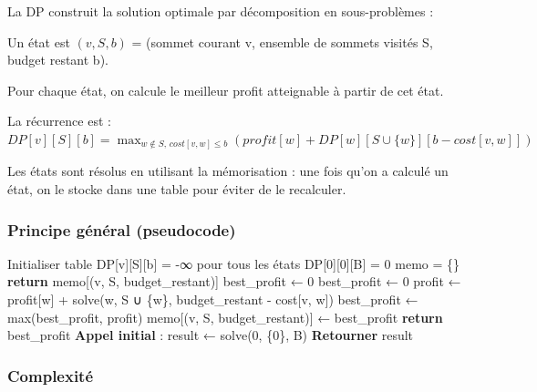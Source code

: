 \documentclass[11pt,a4paper]{article}
\begin{document}
La DP construit la solution optimale par décomposition en sous-problèmes :

Un état est $(v, S, b)$ = (sommet courant v, ensemble de sommets visités S, budget restant b).

Pour chaque état, on calcule le meilleur profit atteignable à partir de cet état.

La récurrence est : $DP[v][S][b] = \max_{w \notin S,\, cost[v,w] \le b} (profit[w] + DP[w][S \cup \{w\}][b - cost[v,w]])$

Les états sont résolus en utilisant la mémorisation : une fois qu'on a calculé un état, on le stocke dans une table pour éviter de le recalculer.

\subsubsection*{Principe général (pseudocode)}

\begin{algorithm}[H]
\caption{Programmation dynamique pour l'OP}
\begin{algorithmic}[1]
\State Initialiser table DP[v][S][b] = -∞ pour tous les états
\State DP[0][{0}][B] = 0 
\State memo = \{\} 
        \State \textbf{return} memo[(v, S, budget\_restant)]
    \EndIf
    \State best\_profit ← 0 
        \State best\_profit ← 0 
    \EndIf
            \State profit ← profit[w] + solve(w, S ∪ \{w\}, budget\_restant - cost[v, w])
            \State best\_profit ← max(best\_profit, profit)
        \EndIf
    \EndFor
    \State memo[(v, S, budget\_restant)] ← best\_profit
    \State \textbf{return} best\_profit
\EndFunction
\State \textbf{Appel initial} : result ← solve(0, \{0\}, B)
\State \textbf{Retourner} result
\end{algorithmic}
\end{algorithm}

\subsubsection*{Complexité}
\end{document}
